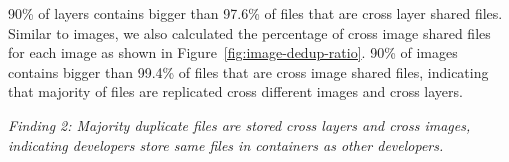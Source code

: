 %
90\% of layers contains bigger than 97.6\% of files that are cross layer shared files. Similar to images, we also calculated the percentage of cross image shared files for each image as shown in Figure~\ref{fig:image-dedup-ratio}. 90\% of images contains bigger than 99.4\% of files that are cross image shared files, indicating that majority of files are replicated cross different images and cross layers.

\textit{Finding 2: Majority duplicate files are stored cross layers and cross images, indicating developers store same files in containers as other developers.}
%


